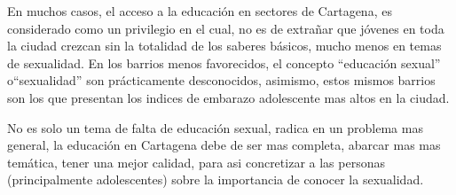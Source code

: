 \documentclass[letterpaper, 12pt]{article}
\begin{document}
En muchos casos, el acceso a la educación en sectores de
Cartagena, es considerado como un privilegio en el cual, no
es de extrañar que jóvenes en toda la ciudad crezcan sin la
totalidad de los saberes básicos, mucho menos en temas de
sexualidad. En los barrios menos favorecidos, el concepto
``educación sexual'' o``sexualidad'' son prácticamente
desconocidos, asimismo, estos mismos barrios son los que
presentan los indices de embarazo adolescente mas altos en
la ciudad.

No es solo un tema de falta de educación sexual, radica en
un problema mas general, la educación en Cartagena debe de
ser mas completa, abarcar mas mas temática, tener una mejor
calidad, para asi concretizar a las personas
(principalmente adolescentes) sobre la importancia de
conocer la sexualidad.



\newpage

\printbibliography
\end{document}
